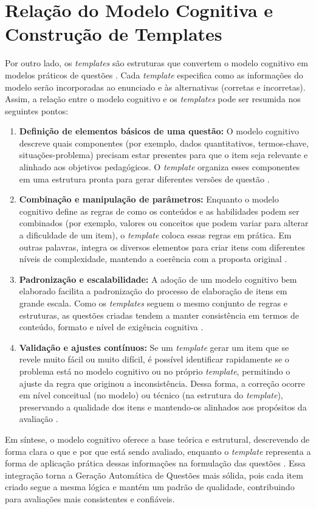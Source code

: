 \section{Relação do Modelo Cognitiva e Construção de Templates }

Por outro lado, os \textit{templates} são estruturas que convertem o modelo cognitivo em modelos práticos de questões \cite{gierl2024}. Cada \textit{template} especifica como as informações do modelo serão incorporadas ao enunciado e às alternativas (corretas e incorretas). Assim, a relação entre o modelo cognitivo e os \textit{templates} pode ser resumida nos seguintes pontos:

\begin{enumerate} \item \textbf{Definição de elementos básicos de uma questão:} O modelo cognitivo descreve quais componentes (por exemplo, dados quantitativos, termos-chave, situações-problema) precisam estar presentes para que o item seja relevante e alinhado aos objetivos pedagógicos. O \textit{template} organiza esses componentes em uma estrutura pronta para gerar diferentes versões de questão \cite{lane2016}.
\item \textbf{Combinação e manipulação de parâmetros:} Enquanto o modelo cognitivo define as regras de como os conteúdos e as habilidades podem ser combinados (por exemplo, valores ou conceitos que podem variar para alterar a dificuldade de um item), o \textit{template} coloca essas regras em prática. Em outras palavras, integra os diversos elementos para criar itens com diferentes níveis de complexidade, mantendo a coerência com a proposta original \cite{embretson2017}.

\item \textbf{Padronização e escalabilidade:} A adoção de um modelo cognitivo bem elaborado facilita a padronização do processo de elaboração de itens em grande escala. Como os \textit{templates} seguem o mesmo conjunto de regras e estruturas, as questões criadas tendem a manter consistência em termos de conteúdo, formato e nível de exigência cognitiva \cite{gierl2016, gierl2017}.

\item \textbf{Validação e ajustes contínuos:} Se um \textit{template} gerar um item que se revele muito fácil ou muito difícil, é possível identificar rapidamente se o problema está no modelo cognitivo ou no próprio \textit{template}, permitindo o ajuste da regra que originou a inconsistência. Dessa forma, a correção ocorre em nível conceitual (no modelo) ou técnico (na estrutura do \textit{template}), preservando a qualidade dos itens e mantendo-os alinhados aos propósitos da avaliação \cite{gierlbulutzhang2018}.
\end{enumerate}
Em síntese, o modelo cognitivo oferece a base teórica e estrutural, descrevendo de forma clara o que e por que está sendo avaliado, enquanto o \textit{template} representa a forma de aplicação prática dessas informações na formulação das questões \cite{gierl2024}. Essa integração torna a Geração Automática de Questões mais sólida, pois cada item criado segue a mesma lógica e mantém um padrão de qualidade, contribuindo para avaliações mais consistentes e confiáveis.


